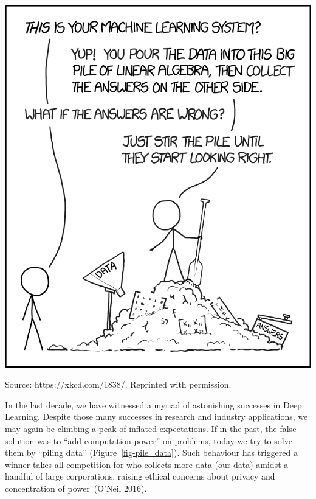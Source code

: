 \documentclass[
  letterpaper,
  12pt,
  british]{tufte-book}
\theoremstyle{plain}
\theoremstyle{definition}
\theoremstyle{plain}
\theoremstyle{remark}
\begin{document}
\begin{marginfigure}

{\centering \includegraphics{Images/machine_learning_2x.png}

}

\caption{\label{fig-pile_data}Source: https://xkcd.com/1838/. Reprinted
with permission.}

\end{marginfigure}

In the last decade, we have witnessed a myriad of astonishing successes
in Deep Learning. Despite those many successes in research and industry
applications, we may again be climbing a peak of inflated expectations.
If in the past, the false solution was to ``add computation power'' on
problems, today we try to solve them by ``piling data''
(Figure~\ref{fig-pile_data}). Such behaviour has triggered a
winner-takes-all competition for who collects more data (our data)
amidst a handful of large corporations, raising ethical concerns about
privacy and concentration of power~(O'Neil
2016).
\end{document}
